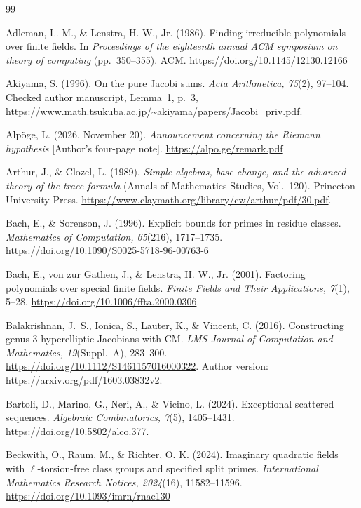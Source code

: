 \documentclass[11pt]{article}
\theoremstyle{definition}
\theoremstyle{remark}
\begin{document}
\begin{thebibliography}{99}

Adleman, L. M., \& Lenstra, H. W., Jr. (1986).
Finding irreducible polynomials over finite fields.
In \emph{Proceedings of the eighteenth annual ACM symposium on theory of computing}
(pp.~350--355). ACM. \url{https://doi.org/10.1145/12130.12166}

Akiyama, S. (1996).
On the pure Jacobi sums.
\emph{Acta Arithmetica, 75}(2), 97--104.
Checked author manuscript, Lemma~1, p.~3,
\url{https://www.math.tsukuba.ac.jp/~akiyama/papers/Jacobi_priv.pdf}.

Alp\"oge, L. (2026, November 20).
\emph{Announcement concerning the Riemann hypothesis} [Author's four-page note].
\url{https://alpo.ge/remark.pdf}

Arthur, J., \& Clozel, L. (1989).
\emph{Simple algebras, base change, and the advanced theory of the trace formula}
(Annals of Mathematics Studies, Vol.~120). Princeton University Press.
\url{https://www.claymath.org/library/cw/arthur/pdf/30.pdf}.

Bach, E., \& Sorenson, J. (1996).
Explicit bounds for primes in residue classes.
\emph{Mathematics of Computation, 65}(216), 1717--1735.
\url{https://doi.org/10.1090/S0025-5718-96-00763-6}

Bach, E., von zur Gathen, J., \& Lenstra, H. W., Jr. (2001).
Factoring polynomials over special finite fields.
\emph{Finite Fields and Their Applications, 7}(1), 5--28.
\url{https://doi.org/10.1006/ffta.2000.0306}.

Balakrishnan, J.~S., Ionica, S., Lauter, K., \& Vincent, C. (2016).
Constructing genus-3 hyperelliptic Jacobians with CM.
\emph{LMS Journal of Computation and Mathematics, 19}(Suppl.~A), 283--300.
\url{https://doi.org/10.1112/S1461157016000322}.
Author version: \url{https://arxiv.org/pdf/1603.03832v2}.

Bartoli, D., Marino, G., Neri, A., \& Vicino, L. (2024).
Exceptional scattered sequences.
\emph{Algebraic Combinatorics, 7}(5), 1405--1431.
\url{https://doi.org/10.5802/alco.377}.

Beckwith, O., Raum, M., \& Richter, O. K. (2024).
Imaginary quadratic fields with $\ell$-torsion-free class groups and
specified split primes.
\emph{International Mathematics Research Notices, 2024}(16),
11582--11596. \url{https://doi.org/10.1093/imrn/rnae130}


\end{thebibliography}
\end{document}
